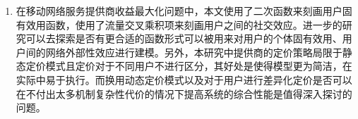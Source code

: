 \begin{enumerate}
    \item 在移动网络服务提供商收益最大化问题中，本文使用了二次函数来刻画用户固有效用函数，使用了流量交叉乘积项来刻画用户之间的社交效应。进一步的研究可以去探索是否有更合适的函数形式可以被用来对用户的个体固有效用、用户间的网络外部性效应进行建模。另外，本研究中提供商的定价策略局限于静态定价模式且定价对于不同用户不进行区分，其好处是使得模型更为简洁，在实际中易于执行。而换用动态定价模式以及对于用户进行差异化定价是否可以在不付出太多机制复杂性代价的情况下提高系统的综合性能是值得深入探讨的问题。
\end{enumerate}







